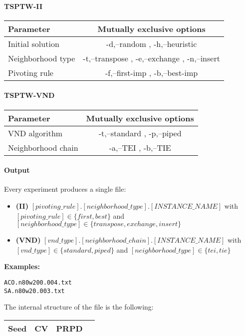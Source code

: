 \documentclass{article}
\begin{document}
\paragraph{TSPTW-II}
\begin{tabular}{|l|c|}
\hline
\textbf{Parameter}	&	\textbf{Mutually exclusive options} \\ \hline
Initial solution & -d,--random , -h,--heuristic \\ \hline
Neighborhood type &-t,--transpose , -e,--exchange , -n,--insert \\ \hline 
Pivoting rule &	-f,--first-imp , -b,--best-imp \\ \hline
\end{tabular}

\paragraph{TSPTW-VND}

\begin{tabular}{|l|c|}
\hline
\textbf{Parameter}	&	\textbf{Mutually exclusive options} \\ \hline
VND algorithm & -t,--standard , -p,--piped \\ \hline
Neighborhood chain & 	-a,--TEI  , -b,--TIE \\ \hline
\end{tabular}

\paragraph{Output}
Every experiment produces a single file:
\begin{itemize}
  \item \textbf{(II)} $[pivoting\_rule].[neighborhood\_type].[INSTANCE\_NAME]$ with $[pivoting\_rule] \in \{first,best\}$ and $[neighborhood\_type] \in \{transpose,exchange,insert\}$ 
  \item \textbf{(VND)} $[vnd\_type].[neighborhood\_chain].[INSTANCE\_NAME]$ with $[vnd\_type] \in \{standard,piped\}$ and $[neighborhood\_type] \in \{tei,tie\}$
\end{itemize} 
				
					 
\textbf{Examples:} \begin{verbatim}
ACO.n80w200.004.txt
SA.n80w20.003.txt
\end{verbatim}


The internal structure of the file is the following: 
\begin{tabular}{|c|c|c|c|}
\hline
\textbf{Seed}	&	\textbf{CV} & \textbf{PRPD} \\ \hline
\end{tabular}
\end{document}

